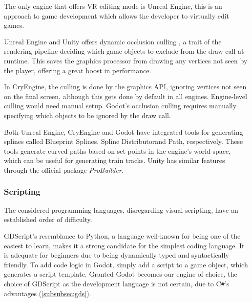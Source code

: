 The only engine that offers VR editing mode is Unreal Engine, this is an approach to game development which allows the developer to virtually edit games. \cite{Unreal_VR_mode}

Unreal Engine and Unity offers dynamic occlusion culling \footnotemark[1] \footnotemark[2], a trait of the rendering pipeline deciding which game objects to exclude from the draw call at runtime. This saves the graphics processor from drawing any vertices not seen by the player, offering a great boost in performance.


In CryEngine, the culling is done by the graphics API, ignoring vertices not seen on the final screen, although this gets done by default in all engines. Engine-level culling would need manual setup. Godot's occlusion culling requires manually specifying which objects to be ignored by the draw call. 

Both Unreal Engine, CryEngine and Godot have integrated tools for generating splines called Blueprint Splines\footnotemark[1], Spline Distributor\footnotemark[2] and Path\footnotemark[3], respectively. These tools generate curved paths based on set points in the engine's world-space, which can be useful for generating train tracks. Unity has similar features through the official package \textit{ProBuilder}.


\subsubsection{Scripting}
The considered programming languages, disregarding visual scripting, have an established order of difficulty. 

GDScript's resemblance to Python, a language well-known for being one of the easiest to learn, makes it a strong candidate for the simplest coding language. It is adequate for beginners due to being dynamically typed and syntactically friendly. To add code logic in Godot, simply add a script to a game object, which generates a script template. Granted Godot becomes our engine of choice, the choice of GDScript as the development language is not certain, due to  C\texttt{\#}'s advantages (\ref{subsubsec:gds}). 

